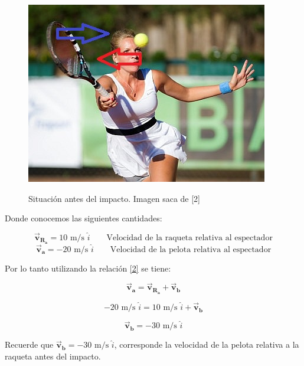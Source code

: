 \documentclass[a4paper,11pt]{article}
\theoremstyle{mytheor}
\begin{document}
\begin{figure}[h]
	\includegraphics[width=1.0\linewidth]{./im/ten}
	\label{fcN4}
		\caption{Situación antes del impacto. Imagen saca de [2]}
\end{figure}



Donde conocemos las siguientes cantidades:




$$ \vec{\textbf{v}}_{\textbf{R}_\textbf{a}} = 10 \text{ m/s } \hat{i} \qquad \text{Velocidad de la raqueta relativa al espectador}$$
$$ \vec{\textbf{v}}_{\textbf{a}} = -20 \text{ m/s } \hat{i} \qquad \text{Velocidad de la pelota relativa al espectador}$$ 

Por lo tanto utilizando la relación \ref{2} se tiene:


\begin{equation}
\vec{\textbf{v}}_{\textbf{a}} = \vec{\textbf{v}}_{\textbf{R}_\textbf{a}} + \vec{\textbf{v}}_{\textbf{b}} 
\end{equation}


\begin{equation}
-20 \text{ m/s } \hat{i} =  10 \text{ m/s } \hat{i} + \vec{\textbf{v}}_{\textbf{b}} 
\end{equation}

\begin{equation}
 \vec{\textbf{v}}_{\textbf{b}}=  -30 \text{ m/s } \hat{i}  
\end{equation}

Recuerde que  $\vec{\textbf{v}}_{\textbf{b}} = -30  \text{ m/s } \hat{i} $, corresponde  la velocidad de la pelota relativa a la raqueta antes del impacto.
\end{document}
